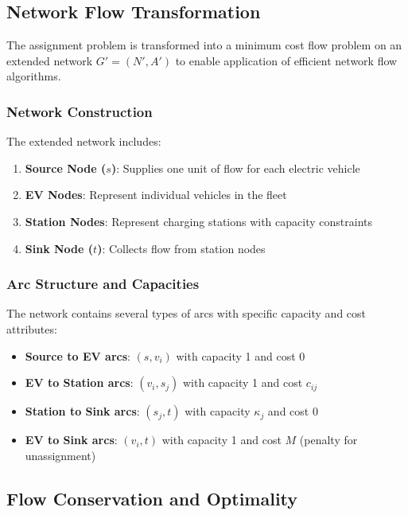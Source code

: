 \documentclass[12pt,a4paper]{article}
\begin{document}
\subsection{Network Flow Transformation}

The assignment problem is transformed into a minimum cost flow problem on an extended network $G' = (N', A')$ to enable application of efficient network flow algorithms.

\subsubsection{Network Construction}

The extended network includes:

\begin{enumerate}
\item \textbf{Source Node ($s$)}: Supplies one unit of flow for each electric vehicle
\item \textbf{EV Nodes}: Represent individual vehicles in the fleet
\item \textbf{Station Nodes}: Represent charging stations with capacity constraints
\item \textbf{Sink Node ($t$)}: Collects flow from station nodes
\end{enumerate}

\subsubsection{Arc Structure and Capacities}

The network contains several types of arcs with specific capacity and cost attributes:

\begin{itemize}
\item \textbf{Source to EV arcs}: $(s, v_i)$ with capacity 1 and cost 0
\item \textbf{EV to Station arcs}: $(v_i, s_j)$ with capacity 1 and cost $c_{ij}$
\item \textbf{Station to Sink arcs}: $(s_j, t)$ with capacity $\kappa_j$ and cost 0
\item \textbf{EV to Sink arcs}: $(v_i, t)$ with capacity 1 and cost $M$ (penalty for unassignment)
\end{itemize}

\subsection{Flow Conservation and Optimality}
\end{document}
